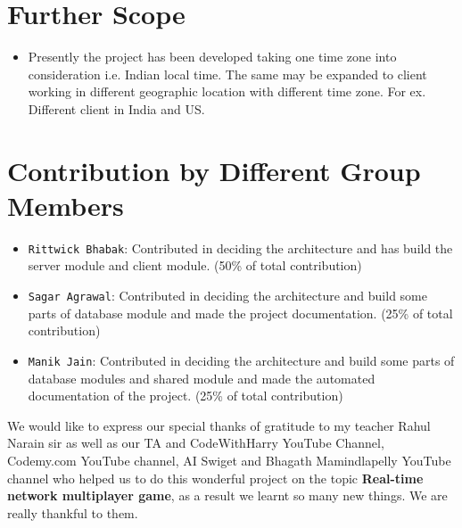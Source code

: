 \documentclass[manuscript,screen,review,nonacm]{acmart}
\begin{document}
\section{Further Scope}
\begin{itemize}
    \item Presently the project has been developed taking one time zone into consideration i.e. Indian local time. The same may be expanded to client working in different geographic location with different time zone. For ex. Different client in India and US.
\end{itemize}

\section{Contribution by Different Group Members}
\begin{itemize}
    \item {\verb|Rittwick Bhabak|}: Contributed in deciding the architecture and has build the server module and client module. (50\% of total contribution)
    \item {\verb|Sagar Agrawal|}: Contributed in deciding the architecture and build some parts of database module and made the project documentation. (25\% of total contribution)
    \item {\verb|Manik Jain|}: Contributed in deciding the architecture and build some parts of database modules and shared module and made the automated documentation of the project. (25\% of total contribution)
\end{itemize}

\printbibliography

\begin{acks}
We would like to express our special thanks of gratitude to my teacher Rahul Narain sir as well as our TA and CodeWithHarry\cite{codewithharry} YouTube Channel, Codemy.com\cite{codemy} YouTube channel, AI Swiget\cite{atbswp} and Bhagath Mamindlapelly YouTube channel who helped us to do this wonderful project on the topic \textbf{Real-time network multiplayer game}, as a result we learnt so many new things. We are really thankful to them.
\end{acks}

\appendix
\end{document}
